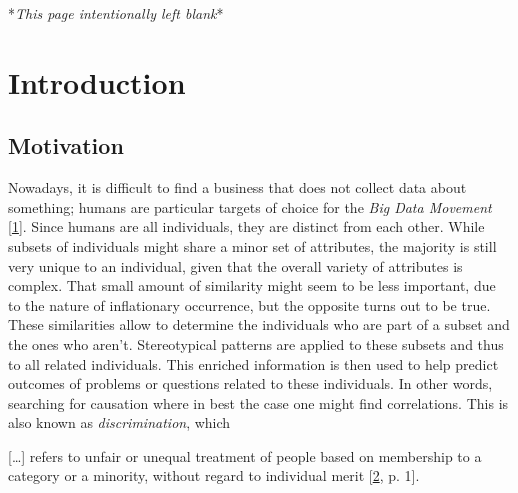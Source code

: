 \documentclass[12pt,english,a4paper,titlepage,cleardoublepage=empty,dottedtoc]{report}
\let\origquote\quote
\let\endorigquote\endquote
\renewenvironment{quote}{%
    \origquote
    \itshape
}
{\endorigquote}
\begin{document}
\vspace*{\fill}

\begin{center}
\thispagestyle{empty}
\setcounter{page}{0}
*\emph{This page intentionally left blank}*
\end{center}

\vspace*{\fill} \newpage

\chapter{Introduction}\label{introduction}

\section{Motivation}\label{motivation}

Nowadays, it is difficult to find a business that does not collect data
about something; humans are particular targets of choice for the
\emph{Big Data Movement}
{[}\protect\hyperlink{ref-web_2016_privacy-international-about-big-data}{1}{]}.
Since humans are all individuals, they are distinct from each other.
While subsets of individuals might share a minor set of attributes, the
majority is still very unique to an individual, given that the overall
variety of attributes is complex. That small amount of similarity might
seem to be less important, due to the nature of inflationary occurrence,
but the opposite turns out to be true. These similarities allow to
determine the individuals who are part of a subset and the ones who
aren't. Stereotypical patterns are applied to these subsets and thus to
all related individuals. This enriched information is then used to help
predict outcomes of problems or questions related to these individuals.
In other words, searching for causation where in best the case one might
find correlations. This is also known as \emph{discrimination}, which

\begin{quote}
{[}\ldots{}{]} refers to unfair or unequal treatment of people based on
membership to a category or a minority, without regard to individual
merit
{[}\protect\hyperlink{ref-paper_2008_discrimination-aware-data-mining}{2},
p. 1{]}.
\end{quote}
\end{document}
